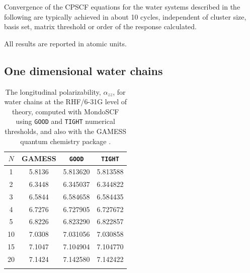 \documentclass[prl,aps,letterpaper,twocolumn,showpacs,twocolumngrid,superbib]{revtex4}
\begin{document}
Convergence of the CPSCF equations for the water systems described in the following 
are typically achieved in about 10 cycles, independent of cluster size, basis set,
matrix threshold or order of the response calculated.

All results are reported in atomic units.



\subsection{One dimensional water chains}

\begin{table}[h]
  \centering
  \caption{\protect
    The longitudinal polarizability, $\alpha_{zz}$, for water chains at the RHF/6-31G level
    of theory, computed with {\sc MondoSCF} using {\tt GOOD} and {\tt TIGHT} numerical thresholds, 
   and also with the {\sc GAMESS} quantum chemistry package \cite{gamess}.
  }\label{tab:Alpha_1D_Values}
  \begin{tabular}{cccc}
    \toprule
    $N$ &\multicolumn{1}{c}{{\sc GAMESS}}
        &\multicolumn{1}{c}{{\tt GOOD}}
        &\multicolumn{1}{c}{{\tt TIGHT}}\\
    \hline
    1 & 5.8136 & 5.813620 & 5.813588 \\
    2 & 6.3448 & 6.345037 & 6.344822 \\
    3 & 6.5844 & 6.584658 & 6.584435 \\
    4 & 6.7276 & 6.727905 & 6.727672 \\
    5 & 6.8226 & 6.823290 & 6.822857 \\
   10 & 7.0308 & 7.031056 & 7.030858 \\
   15 & 7.1047 & 7.104904 & 7.104770 \\
   20 & 7.1424 & 7.142580 & 7.142422 \\
    \botrule
  \end{tabular}
\end{table}
\end{document}
